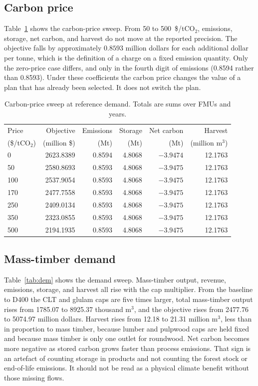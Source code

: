 \documentclass[11pt]{article}
\begin{document}
\subsection{Carbon price}

Table~\ref{tab:cp} shows the carbon-price sweep. From 50 to 500~\$/tCO$_2$, emissions, storage, net carbon, and harvest do not move at the reported precision. The objective falls by approximately $0.8593$ million dollars for each additional dollar per tonne, which is the definition of a charge on a fixed emission quantity. Only the zero-price case differs, and only in the fourth digit of emissions (0.8594 rather than 0.8593). Under these coefficients the carbon price changes the value of a plan that has already been selected. It does not switch the plan.

\begin{table}[ht]
\centering
\caption{Carbon-price sweep at reference demand. Totals are sums over FMUs and years.}
\label{tab:cp}
\begin{tabular}{lrrrrr}
\toprule
Price & Objective & Emissions & Storage & Net carbon & Harvest \\
(\$/tCO$_2$) & (million \$) & (Mt) & (Mt) & (Mt) & (million m$^3$) \\
\midrule
0 & 2623.8389 & 0.8594 & 4.8068 & $-3.9474$ & 12.1763 \\
50 & 2580.8693 & 0.8593 & 4.8068 & $-3.9475$ & 12.1763 \\
100 & 2537.9054 & 0.8593 & 4.8068 & $-3.9475$ & 12.1763 \\
170 & 2477.7558 & 0.8593 & 4.8068 & $-3.9475$ & 12.1763 \\
250 & 2409.0134 & 0.8593 & 4.8068 & $-3.9475$ & 12.1763 \\
350 & 2323.0855 & 0.8593 & 4.8068 & $-3.9475$ & 12.1763 \\
500 & 2194.1935 & 0.8593 & 4.8068 & $-3.9475$ & 12.1763 \\
\bottomrule
\end{tabular}
\end{table}

\subsection{Mass-timber demand}

Table~\ref{tab:dem} shows the demand sweep. Mass-timber output, revenue, emissions, storage, and harvest all rise with the cap multiplier. From the baseline to D400 the CLT and glulam caps are five times larger, total mass-timber output rises from 1785.07 to 8925.37 thousand m$^3$, and the objective rises from 2477.76 to 5074.97 million dollars. Harvest rises from 12.18 to 21.31 million m$^3$, less than in proportion to mass timber, because lumber and pulpwood caps are held fixed and because mass timber is only one outlet for roundwood. Net carbon becomes more negative as stored carbon grows faster than process emissions. That sign is an artefact of counting storage in products and not counting the forest stock or end-of-life emissions. It should not be read as a physical climate benefit without those missing flows.
\end{document}
